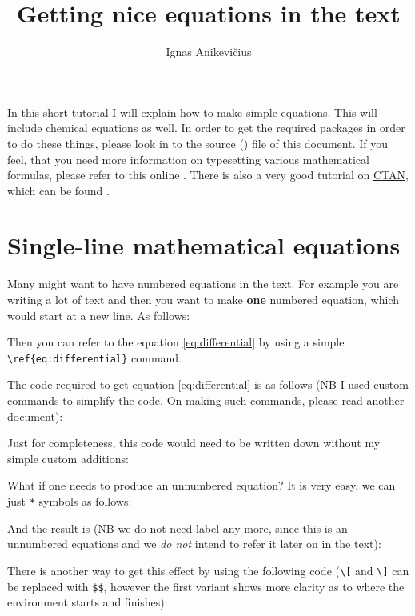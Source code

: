 \documentclass[
]{scrartcl}
\title{Getting nice equations in the text}
\author{Ignas Anikevičius}
\begin{document}
\maketitle
\tableofcontents
\listoftodos{\vskip 1em}

%
In this short tutorial I will explain how to make simple equations.
%
This will include chemical equations as well. 
%
In order to get the required packages in order to do these things, please look
    in to the source () file of this document.
%
If you feel, that you need more information on typesetting various mathematical
    formulas, please refer to this online
    .
%
There is also a very good tutorial on \href{http://www.ctan.org}{CTAN}, which
    can be found
    .

\section{Single-line mathematical equations}

%
Many might want to have numbered equations in the text.
%
For example you are writing a lot of text and then you want to make \textbf{one}
    numbered equation, which would start at a new line.
%
As follows:
%


%
Then you can refer to the equation \ref{eq:differential} by using a simple
    \verb|\ref{eq:differential}| command.

%
The code required to get equation \ref{eq:differential} is as follows (NB I used
    custom commands to simplify the code.
%
On making such commands, please read another document):
%


%
Just for completeness, this code would need to be written down without my simple
    custom additions:
%


%
What if one needs to produce an unnumbered equation?
%
It is very easy, we can just \verb|*| symbols as follows:
%

%
And the result is (NB we do not need label any more, since this is an unnumbered
    equations and we \emph{do not} intend to refer it later on in the text):
    

%
There is another way to get this effect by using the following code (\verb|\[|
    and \verb|\]| can be replaced with \verb|$$|, however the first variant
    shows more clarity as to where the environment starts and finishes):
    
\end{document}

